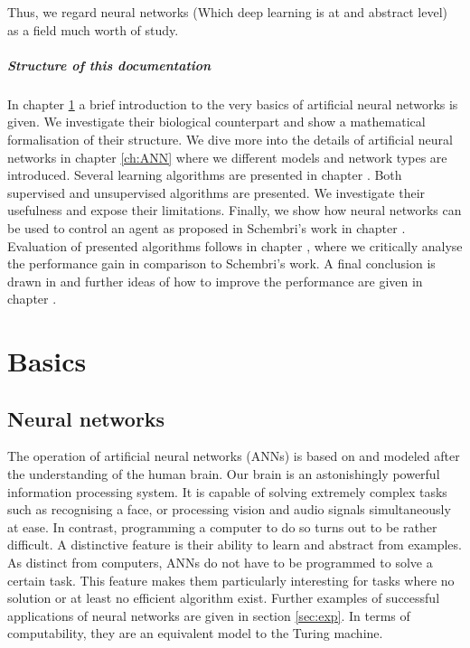 \documentclass[10pt,a4paper,DIV=11]{scrreprt}
\begin{document}
Thus, we regard neural networks (Which deep learning is at and abstract level) as a field much worth of study.

\paragraph{Structure of this documentation}
In chapter \ref{ch:basics} a brief introduction to the very basics of artificial neural networks is given. We investigate their biological counterpart
and show a mathematical formalisation of their structure. We dive more into the details of artificial neural networks in chapter \ref{ch:ANN} where
we different models and network types are introduced. Several learning algorithms are presented in chapter \label{ch:learning}. Both
supervised and unsupervised algorithms are presented. We investigate their usefulness and expose their limitations. 
Finally, we show how neural networks can be used to control an agent as proposed in Schembri's work in chapter \label{ch:design}. 
Evaluation of presented algorithms follows in chapter \label{ch:eval}, where we critically analyse the performance gain in comparison to Schembri's work. A final conclusion is drawn in 
\label{ch:conclusion} and further ideas of how to improve the performance are given in chapter \label{ch:future}.

\chapter{Basics}
\label{ch:basics}
\section{Neural networks}
The operation of artificial neural networks (ANNs) is based on and modeled after the understanding of the human brain. 
Our brain is an astonishingly powerful information processing system. It is capable of solving extremely complex tasks such as recognising a face, or
processing vision and audio signals simultaneously at ease. In contrast, programming a computer to do so turns out to be rather difficult.
A distinctive feature is their ability to learn and abstract from examples. As distinct from computers, ANNs do not have to be programmed to solve 
a certain task. This feature makes them particularly interesting for tasks where no solution or at least no efficient algorithm
exist. Further examples of successful applications of neural networks are given in section \ref{sec:exp}.
In terms of computability, they are an equivalent model to the Turing machine.\cite{NURING}
\end{document}

